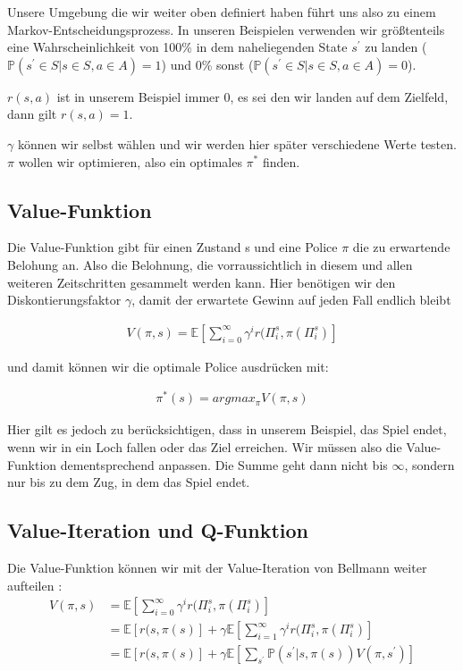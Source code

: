 Unsere Umgebung die wir weiter oben definiert haben führt uns also zu einem Markov-Entscheidungsprozess.  In unseren Beispielen verwenden wir größtenteils eine Wahrscheinlichkeit von 100\% in dem naheliegenden State $s^{\prime}$ zu landen ($\mathbb{P}(s^{\prime} \in S | s \in S, a \in A) = 1$)  und 0\% sonst ($\mathbb{P}(s^{\prime} \in S | s \in S, a \in A) = 0$).

$r(s,a)$ ist in unserem Beispiel immer 0, es sei den wir landen auf dem Zielfeld, dann gilt $r(s,a) = 1$.

$\gamma$ können wir selbst wählen und wir werden hier später verschiedene Werte testen. $\pi$ wollen wir optimieren, also ein optimales $\pi^{*}$ finden.

\subsection{Value-Funktion}
\label{subsec:V}

Die Value-Funktion gibt für einen Zustand s und eine Police $\pi$ die zu erwartende Belohung an. Also die Belohnung, die vorraussichtlich in diesem und allen weiteren Zeitschritten gesammelt werden kann. Hier benötigen wir den Diskontierungsfaktor $\gamma$, damit der erwartete Gewinn auf jeden Fall endlich bleibt \citep{DBLP:journals/jmlr/SallansH04}

\begin{align}
	V(\pi, s) = \mathbb{E}[\sum\limits_{i=0}^{\infty} \gamma^{i} r(\Pi_{i}^{s},\pi(\Pi_{i}^{s})]
\end{align}

und damit können wir die optimale Police ausdrücken mit:

\begin{align}
	\pi^{*}(s) = argmax_{\pi} V(\pi,s)
\end{align}

Hier gilt es jedoch zu berücksichtigen, dass in unserem Beispiel, das Spiel endet, wenn wir in ein Loch fallen oder das Ziel erreichen. Wir müssen also die Value-Funktion dementsprechend anpassen. Die Summe geht dann nicht bis $\infty$, sondern nur bis zu dem Zug, in dem das Spiel endet.

\subsection{Value-Iteration und Q-Funktion}
\label{subsec:VQ}

Die Value-Funktion können wir mit der Value-Iteration von Bellmann weiter aufteilen \citep{Bellman767}:
\begin{align*}
V(\pi, s) 	&= \mathbb{E}[ \sum\limits_{i=0}^{\infty} \gamma^{i} r(\Pi_{i}^{s},\pi( \Pi_{i}^{s} )] \\
			&= \mathbb{E}[r(s,\pi(s)] + \gamma \mathbb{E}[\sum\limits_{i=1}^{\infty} \gamma^{i} r(\Pi_{i}^{s},\pi(\Pi_{i}^{s})] \\
			&= \mathbb{E}[r(s,\pi(s)] + \gamma \mathbb{E}[\sum\limits_{s^{\prime}} \mathbb{P}(s^{\prime} | s, \pi(s) ) V(\pi, s^{\prime})]
\end{align*}

